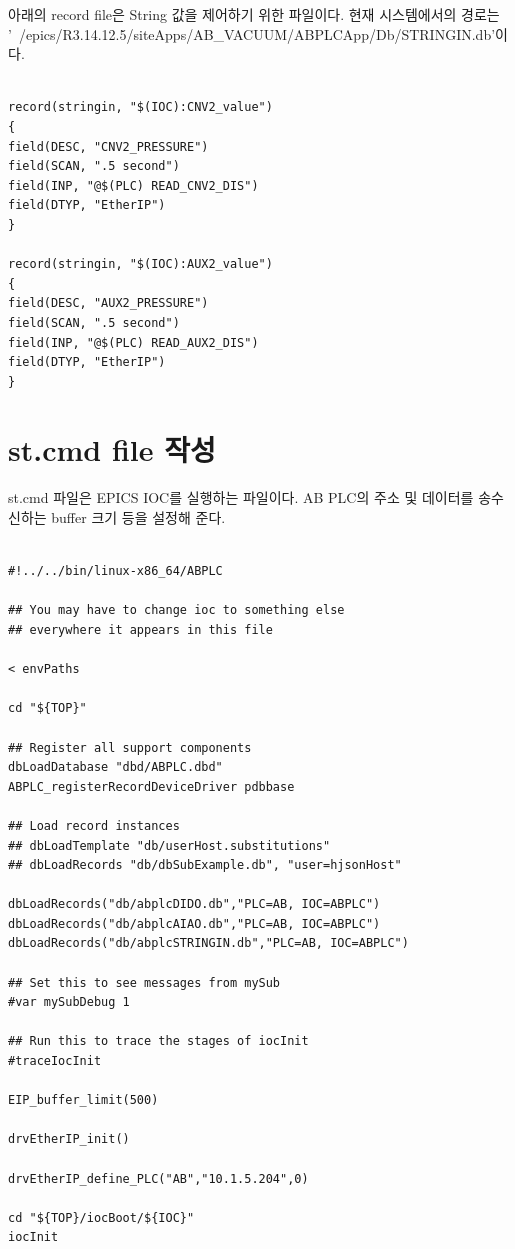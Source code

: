\documentclass[11pt
  , a4paper
  , article
  , oneside
]{memoir}
\begin{document}
아래의 record file은 String 값을 제어하기 위한 파일이다. 현재 시스템에서의 경로는 '~/epics/R3.14.12.5/siteApps/AB\_VACUUM/ABPLCApp/Db/STRINGIN.db'이다.\\
		
\begin{lstlisting}[style=termstyle]

record(stringin, "$(IOC):CNV2_value")
{
field(DESC, "CNV2_PRESSURE")
field(SCAN, ".5 second")
field(INP, "@$(PLC) READ_CNV2_DIS")
field(DTYP, "EtherIP")
}

record(stringin, "$(IOC):AUX2_value")
{
field(DESC, "AUX2_PRESSURE")
field(SCAN, ".5 second")
field(INP, "@$(PLC) READ_AUX2_DIS")
field(DTYP, "EtherIP")
}

\end{lstlisting}

\section{st.cmd file 작성}

st.cmd 파일은 EPICS IOC를 실행하는 파일이다. AB PLC의 주소 및 데이터를 송수신하는 buffer 크기 등을 설정해 준다.\\

\begin{lstlisting}[style=termstyle]

#!../../bin/linux-x86_64/ABPLC

## You may have to change ioc to something else
## everywhere it appears in this file

< envPaths

cd "${TOP}"

## Register all support components
dbLoadDatabase "dbd/ABPLC.dbd"
ABPLC_registerRecordDeviceDriver pdbbase

## Load record instances
## dbLoadTemplate "db/userHost.substitutions"
## dbLoadRecords "db/dbSubExample.db", "user=hjsonHost"

dbLoadRecords("db/abplcDIDO.db","PLC=AB, IOC=ABPLC")
dbLoadRecords("db/abplcAIAO.db","PLC=AB, IOC=ABPLC")
dbLoadRecords("db/abplcSTRINGIN.db","PLC=AB, IOC=ABPLC")

## Set this to see messages from mySub
#var mySubDebug 1

## Run this to trace the stages of iocInit
#traceIocInit

EIP_buffer_limit(500)

drvEtherIP_init()

drvEtherIP_define_PLC("AB","10.1.5.204",0)

cd "${TOP}/iocBoot/${IOC}"
iocInit


\end{lstlisting}
\end{document}
